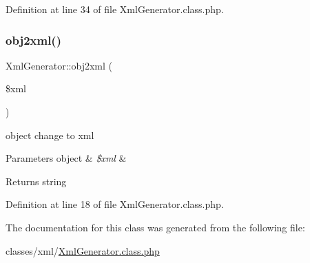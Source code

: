 Definition at line 34 of file Xml\+Generator.\+class.\+php.

\mbox{\label{classXmlGenerator_ae887d13949d0ec6537feb11f6d9aa00f}} 
\subsubsection{\texorpdfstring{obj2xml()}{obj2xml()}}
{\footnotesize\ttfamily Xml\+Generator\+::obj2xml (\begin{DoxyParamCaption}\item[{}]{\$xml }\end{DoxyParamCaption})}

object change to xml 
\begin{DoxyParams}[1]{Parameters}
object & {\em \$xml} & \\
\hline
\end{DoxyParams}
\begin{DoxyReturn}{Returns}
string 
\end{DoxyReturn}


Definition at line 18 of file Xml\+Generator.\+class.\+php.



The documentation for this class was generated from the following file\+:\begin{DoxyCompactItemize}
\item 
classes/xml/\hyperlink{XmlGenerator_8class_8php}{Xml\+Generator.\+class.\+php}\end{DoxyCompactItemize}
